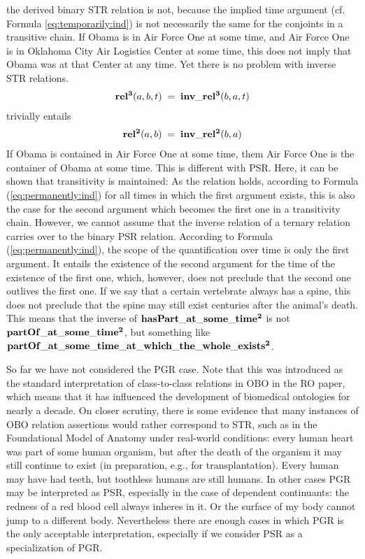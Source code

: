 %
the derived binary STR relation is not, because the implied time argument (cf. Formula \ref{eq:temporarily:ind}) is not necessarily the same for the conjoints in a transitive chain. If Obama is in Air Force One at some time, and Air Force One is in Oklahoma City Air Logistics Center at some time, this does not imply that Obama was at that Center at any time.
Yet there is no problem with inverse STR relations. 
% 
\begin{equation}
\begin{split}
\mathrm{\mathbf{rel^3}}(a,b,t) \; = \; \mathrm{\mathbf{inv\_rel^3}}(b,a,t)  
\end{split}
\label{eq:trinv}
\end{equation}    
%
trivially entails
%
\begin{equation}
\begin{split}
\mathrm{\mathbf{rel^2}}(a,b) \; = \; \mathrm{\mathbf{inv\_rel^2}}(b,a)  
\end{split}
\label{eq:trinv2}
\end{equation}    
%
If Obama is contained in Air Force One at some time, them Air Force One is the container of Obama at some time.
%
This is different with PSR. Here, it can be shown that transitivity is maintained: As the relation holds, according to Formula (\ref{eq:permanently:ind}) for all times in which the first argument exists, this is also the case for the second argument which becomes the first one in a transitivity chain.
However, we cannot assume that the inverse relation of a ternary relation carries over to the binary PSR relation. According to Formula (\ref{eq:permanently:ind}), the scope of the quantification over time is only the first argument. It entails the existence of the second argument for the time of the existence of the first one, which, however, does not preclude that the second one outlives the first one. If we say that a certain vertebrate always has a spine, this does not preclude that the spine may still exist centuries after the animal's death.    
This means that the inverse of $\mathrm{\mathbf{hasPart\_at\_some\_time^2}}$ is not $\mathrm{\mathbf{partOf\_at\_some\_time^2}}$, but something like $\mathrm{\mathbf{partOf\_at\_some\_time\_at\_which\_the\_whole\_exists^2}}$.  

So far we have not considered the PGR case. Note that this was introduced as the standard interpretation of class-to-class relations in OBO in the RO paper, which means that it has influenced the development of biomedical ontologies for nearly a decade. On closer scrutiny, there is some evidence that many instances of OBO relation assertions would rather correspond to STR, such as in the Foundational Model of Anatomy under real-world conditions: every human heart was part of some human organism, but after the death of the organism it may still continue to exist (in preparation, e.g., for transplantation). Every human may have had teeth, but toothless humans are still humans. In other cases PGR may be interpreted as PSR, especially in the case of dependent continuants: the redness of a red blood cell always inheres in it. Or the surface of my body cannot jump to a different body. Nevertheless there are enough cases in which PGR is the only acceptable interpretation, especially if we consider PSR as a specialization of PGR.

